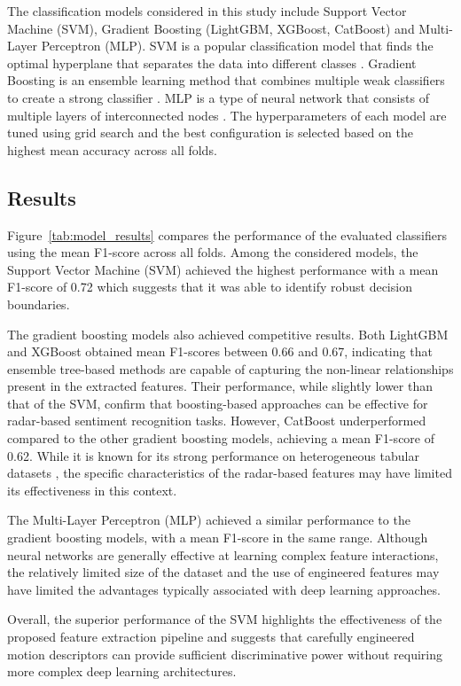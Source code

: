 \documentclass{article}
\begin{document}
The classification models considered in this study include Support Vector Machine (SVM), Gradient Boosting (LightGBM, XGBoost, CatBoost) and Multi-Layer Perceptron (MLP). SVM is a popular classification model that finds the optimal hyperplane that separates the data into different classes \cite{svm2022}. Gradient Boosting is an ensemble learning method that combines multiple weak classifiers to create a strong classifier \cite{xgboost2025}. MLP is a type of neural network that consists of multiple layers of interconnected nodes \cite{mlp2009}. The hyperparameters of each model are tuned using grid search and the best configuration is selected based on the highest mean accuracy across all folds.


\subsection{Results}

Figure~\ref{tab:model_results} compares the performance of the evaluated classifiers using the mean F1-score across all folds. Among the considered models, the Support Vector Machine (SVM) achieved the highest performance with a mean F1-score of 0.72 which suggests that it was able to identify robust decision boundaries.

The gradient boosting models also achieved competitive results. Both LightGBM and XGBoost obtained mean F1-scores between 0.66 and 0.67, indicating that ensemble tree-based methods are capable of capturing the non-linear relationships present in the extracted features. Their performance, while slightly lower than that of the SVM, confirm that boosting-based approaches can be effective for radar-based sentiment recognition tasks. However, CatBoost underperformed compared to the other gradient boosting models, achieving a mean F1-score of 0.62. While it is known for its strong performance on heterogeneous tabular datasets \cite{xgboost2025}, the specific characteristics of the radar-based features may have limited its effectiveness in this context.

The Multi-Layer Perceptron (MLP) achieved a similar performance to the gradient boosting models, with a mean F1-score in the same range. Although neural networks are generally effective at learning complex feature interactions, the relatively limited size of the dataset and the use of engineered features may have limited the advantages typically associated with deep learning approaches.

Overall, the superior performance of the SVM highlights the effectiveness of the proposed feature extraction pipeline and suggests that carefully engineered motion descriptors can provide sufficient discriminative power without requiring more complex deep learning architectures.
\end{document}
